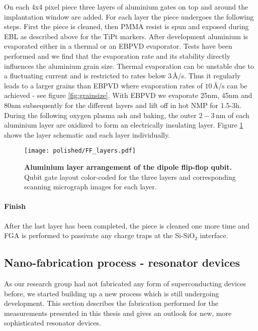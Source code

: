 On each 4x4 pixel piece three layers of aluminium gates on top and around the implantation window are added. For each layer the piece undergoes the following steps. 
First the piece is cleaned, then PMMA resist is spun and exposed during EBL as described above for the TiPt markers. After development aluminium is evaporated either in a thermal or an EBPVD evaporator. Tests have been performed and we find that the evaporation rate and its stability directly influences the aluminium grain size. Thermal evaporation can be unstable due to a fluctuating current and is restricted to rates below $3\,$\AA/s. Thus it regularly leads to a larger grains than EBPVD where evaporation rates of $10\,$\AA/s can be achieved - see figure \ref{fig:grainsize}. With EBPVD we evaporate 25nm, 45nm and 80nm subsequently for the different layers and lift off in hot NMP for 1.5-3h. During the following oxygen plasma ash and baking, the outer $2-3\,$nm of each aluminium layer are oxidized to form an electrically insulating layer. Figure \ref{fig:ff_layers} shows the layer schematic and each layer individually. 

\begin{figure}
	\centering
	\texttt{[image: polished/FF\_layers.pdf]}
	\caption[Aluminium layer arrangement of the dipole flip-flop qubit]{\textbf{Aluminium layer arrangement of the dipole flip-flop qubit.} Qubit gate layout color-coded for the three layers and corresponding scanning micrograph images for each layer.}
	\label{fig:ff_layers}
\end{figure}

\paragraph*{Finish}
After the last layer has been completed, the piece is cleaned one more time and FGA is performed to passivate any charge traps at the Si-SiO$_2$ interface\cite{Brower1988}.

\subsection{Nano-fabrication process - resonator devices} \label{sec:fab_cpwr}

As our research group had not fabricated any form of superconducting devices before, we started building up a new process which is still undergoing development. This section describes the fabrication performed for the measurements presented in this thesis and gives an outlook for new, more sophisticated resonator devices. 

